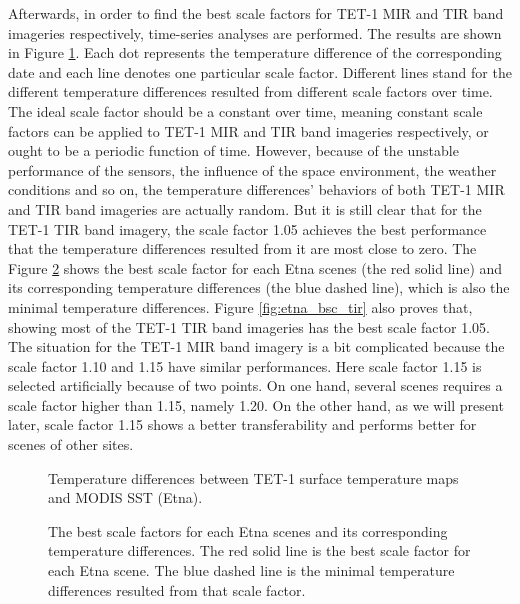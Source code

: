 \noindent Afterwards, in order to find the best scale factors for TET-1 MIR and TIR band imageries respectively, time-series analyses are performed. The results are shown in Figure \ref{fig:etna_sc_mir_tir}. Each dot represents the temperature difference of the corresponding date and each line denotes one particular scale factor. Different lines stand for the different temperature differences resulted from different scale factors over time. The ideal scale factor should be a constant over time, meaning constant scale factors can be applied to TET-1 MIR and TIR band imageries respectively, or ought to be a periodic function of time. However, because of the unstable performance of the sensors, the influence of the space environment, the weather conditions and so on, the temperature differences' behaviors of both TET-1 MIR and TIR band imageries are actually random. But it is still clear that for the TET-1 TIR band imagery, the scale factor 1.05 achieves the best performance that the temperature differences resulted from it are most close to zero. The Figure \ref{fig:etna_bsc_tem} shows the best scale factor for each Etna scenes (the red solid line) and its corresponding temperature differences (the blue dashed line), which is also the minimal temperature differences. Figure \ref{fig:etna_bsc_tir} also proves that, showing most of the TET-1 TIR band imageries has the best scale factor 1.05.\\

\noindent The situation for the TET-1 MIR band imagery is a bit complicated because the scale factor 1.10 and 1.15 have similar performances. Here scale factor 1.15 is selected artificially because of two points. On one hand, several scenes requires a scale factor higher than 1.15, namely 1.20. On the other hand, as we will present later, scale factor 1.15 shows a better transferability and performs better for scenes of other sites.\\

\begin{figure}[!htbp]
\centering
{}
\hspace{0.5in}
\caption{Temperature differences between TET-1 surface temperature maps and MODIS SST (Etna).}
\label{fig:etna_sc_mir_tir}
\end{figure}

\begin{figure}[!htbp]
\centering
{}
\hspace{0.5in}
\caption{The best scale factors for each Etna scenes and its corresponding temperature differences. The red solid line is the best scale factor for each Etna scene. The blue dashed line is the minimal temperature differences resulted from that scale factor.}
\label{fig:etna_bsc_tem}
\end{figure}

